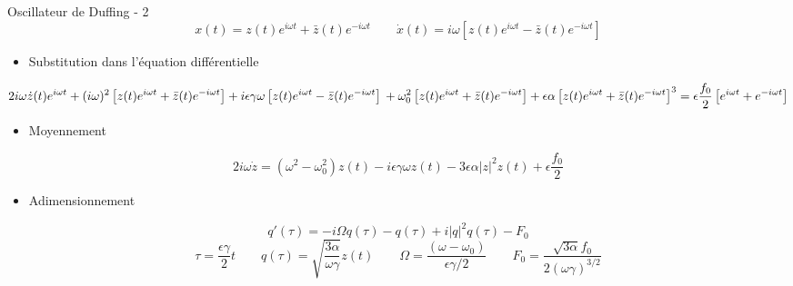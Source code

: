 \begin{frame}{Oscillateur de Duffing - 2}
  \begin{equation*}
    x(t) = z(t)e^{i\omega t} + \bar{z}(t) e^{-i\omega t}
    \qquad 
    \dot{x}(t) = i\omega \left[ z(t)e^{i\omega t} - \bar{z}(t) e^{-i\omega t} \right]
    \label{eq:duff_x_xdot_exp}
  \end{equation*}
  \begin{itemize}
    \item Substitution dans l'équation différentielle
  \end{itemize}
  \begin{dmath*}
    2i\omega \dot{z}(t)e^{i\omega t} + (i\omega)^2 \left[ z(t)e^{i\omega t} + \bar{z}(t) e^{-i\omega t} \right]
    + i\epsilon\gamma\omega \left[ z(t)e^{i\omega t} - \bar{z}(t) e^{-i\omega t} \right] \\
    + \omega_0^2 \left[ z(t)e^{i\omega t} + \bar{z}(t) e^{-i\omega t} \right]
    + \epsilon \alpha \left[ z(t)e^{i\omega t} + \bar{z}(t) e^{-i\omega t} \right]^3 = \epsilon \frac{f_0}{2}\left[ e^{i\omega t} + e^{-i\omega t} \right]
  \end{dmath*}
  \begin{itemize}
    \item Moyennement
  \end{itemize}
  \begin{dmath*}
    2i\omega \dot{z}
    = (\omega^2 - \omega_0^2)z(t) - i\epsilon\gamma\omega z(t) - 3\epsilon\alpha |z|^2 z(t) + \epsilon \frac{f_0}{2}
  \end{dmath*}
  \begin{itemize}
    \item Adimensionnement
  \end{itemize}
  \begin{equation*}
    q'(\tau) = -i\Omega q(\tau) - q(\tau) + i|q|^2q(\tau) - F_0
  \end{equation*}
  \begin{equation*}
    \tau = \frac{\epsilon\gamma}{2}t
    \qquad
    q(\tau) = \sqrt{\frac{3\alpha}{\omega\gamma}}z(t)
    \qquad
    \Omega = \frac{(\omega - \omega_0)}{\epsilon\gamma/2}
    \qquad
    F_0 = \frac{\sqrt{3\alpha}f_0}{2(\omega \gamma)^{3/2}}
  \end{equation*}
  \small
 
\end{frame}

